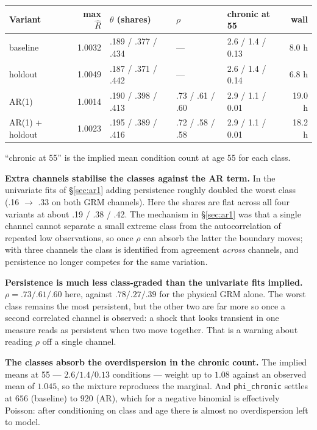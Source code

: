 \documentclass[11pt]{article}
\newcommand{\code}[1]{\texttt{\small #1}}
\begin{document}
\begin{center}\small
\begin{tabular}{lrlllr}
\toprule
Variant & max $\hat R$ & $\theta$ (shares) & $\rho$ & chronic at 55 & wall \\
\midrule
baseline & 1.0032 & .189 / .377 / .434 & --- & 2.6 / 1.4 / 0.13 & 8.0 h \\
holdout & 1.0049 & .187 / .371 / .442 & --- & 2.6 / 1.4 / 0.14 & 6.8 h \\
AR(1) & 1.0014 & .190 / .398 / .413 & .73 / .61 / .60 & 2.9 / 1.1 / 0.01 & 19.0 h \\
AR(1) + holdout & 1.0023 & .195 / .389 / .416 & .72 / .58 / .58 & 2.9 / 1.1 / 0.01 & 18.2 h \\
\bottomrule
\end{tabular}

{\scriptsize ``chronic at 55'' is the implied mean condition count at age 55
for each class.}
\end{center}

\textbf{Extra channels stabilise the classes against the AR term.} In the
univariate fits of \S\ref{sec:ar1} adding persistence roughly doubled the
worst class (.16 $\to$ .33 on both GRM channels). Here the shares are flat
across all four variants at about .19 / .38 / .42. The mechanism in
\S\ref{sec:ar1} was that a single channel cannot separate a small extreme
class from the autocorrelation of repeated low observations, so once $\rho$
can absorb the latter the boundary moves; with three channels the class is
identified from agreement \emph{across} channels, and persistence no longer
competes for the same variation.

\textbf{Persistence is much less class-graded than the univariate fits
implied.} $\rho = .73 / .61 / .60$ here, against $.78 / .27 / .39$ for the
physical GRM alone. The worst class remains the most persistent, but the
other two are far more so once a second correlated channel is observed: a
shock that looks transient in one measure reads as persistent when two move
together. That is a warning about reading $\rho$ off a single channel.

\textbf{The classes absorb the overdispersion in the chronic count.} The
implied means at 55 --- $2.6 / 1.4 / 0.13$ conditions --- weight up to $1.08$
against an observed mean of $1.045$, so the mixture reproduces the marginal.
And \code{phi\_chronic} settles at $656$ (baseline) to $920$ (AR), which for
a negative binomial is effectively Poisson: after conditioning on class and
age there is almost no overdispersion left to model.
\end{document}
